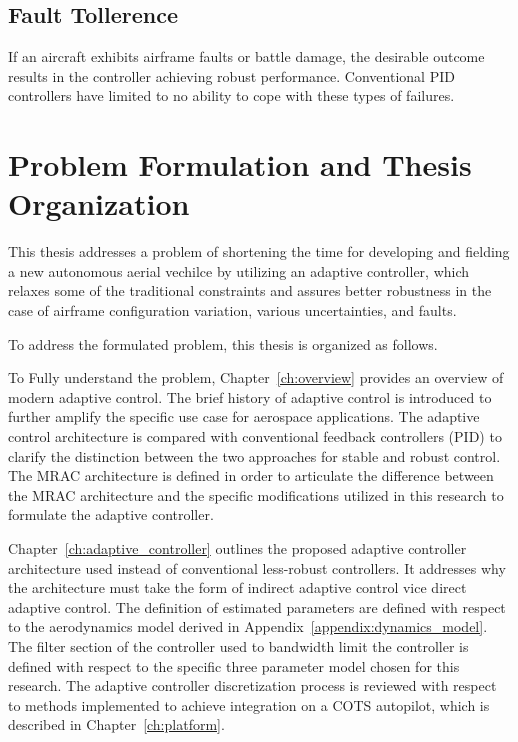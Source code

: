 \subsection{Fault Tollerence}
If an aircraft exhibits airframe faults or battle damage, the desirable outcome results in the controller achieving robust performance.  Conventional \ac{PID} controllers have limited to no ability to cope with these types of failures.

\section{Problem Formulation and Thesis Organization}

This thesis addresses a problem of shortening the time for developing and fielding a new autonomous aerial vechilce by utilizing an adaptive controller, which relaxes some of the traditional constraints and assures better robustness in the case of airframe configuration variation, various uncertainties, and faults.  

To address the formulated problem, this thesis is organized as follows.

To Fully understand the problem, Chapter~\ref{ch:overview} provides an overview of modern adaptive control.  The brief history of adaptive control is introduced to further amplify the specific use case for aerospace applications.  The adaptive control architecture is compared with conventional feedback controllers (\ac{PID}) to clarify the distinction between the two approaches for stable and robust control.  The \ac{MRAC} architecture is defined in order to articulate the difference between the \ac{MRAC} architecture and the specific modifications utilized in this research to formulate the \Lone adaptive controller.

Chapter~\ref{ch:adaptive_controller} outlines the proposed adaptive controller architecture used instead of conventional less-robust controllers.  It addresses why the architecture must take the form of indirect adaptive control vice direct adaptive control.  The definition of estimated parameters are defined with respect to the aerodynamics model derived in Appendix~\ref{appendix:dynamics_model}.  The filter section of the controller used to bandwidth limit the controller is defined with respect to the specific three parameter model chosen for this research.  The \Lone adaptive controller discretization process is reviewed with respect to methods implemented to achieve integration on a \ac{COTS} autopilot, which is described in Chapter~\ref{ch:platform}.

